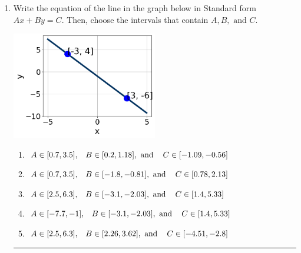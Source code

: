 \documentclass[14pt]{extbook}
\newcommand{\litem}[1]{\item#1\hspace*{-1cm}\rule{\textwidth}{0.4pt}}
\begin{document}
\begin{enumerate}
{\begin{enumerate}[label=\Alph*.]
\end{enumerate} }
\litem{
Write the equation of the line in the graph below in Standard form $Ax+By=C$. Then, choose the intervals that contain $A, B, \text{ and } C$.
\begin{center}
    \includegraphics[width=0.5\textwidth]{../Figures/linearGraphToStandardCopyA.png}
\end{center}
\begin{enumerate}[label=\Alph*.]
\item \( A \in [0.7, 3.5], \hspace{3mm} B \in [0.2, 1.18], \text{ and } \hspace{3mm} C \in [-1.09, -0.56] \)
\item \( A \in [0.7, 3.5], \hspace{3mm} B \in [-1.8, -0.81], \text{ and } \hspace{3mm} C \in [0.78, 2.13] \)
\item \( A \in [2.5, 6.3], \hspace{3mm} B \in [-3.1, -2.03], \text{ and } \hspace{3mm} C \in [1.4, 5.33] \)
\item \( A \in [-7.7, -1], \hspace{3mm} B \in [-3.1, -2.03], \text{ and } \hspace{3mm} C \in [1.4, 5.33] \)
\item \( A \in [2.5, 6.3], \hspace{3mm} B \in [2.26, 3.62], \text{ and } \hspace{3mm} C \in [-4.51, -2.8] \)


\end{enumerate}}
\end{enumerate}
\end{document}
